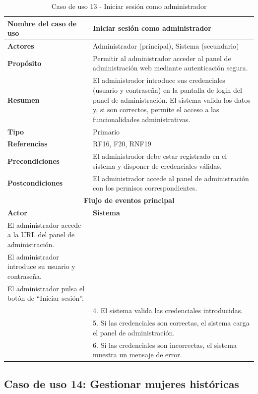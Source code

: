 \begin{table}[H]
\centering
\caption{Caso de uso 13 - Iniciar sesión como administrador}
\begin{tabular}{|p{4.5cm}|p{10.5cm}|}
\hline
\textbf{Nombre del caso de uso} & Iniciar sesión como administrador \\
\hline
\textbf{Actores} & Administrador (principal), Sistema (secundario) \\
\hline
\textbf{Propósito} & Permitir al administrador acceder al panel de administración web mediante autenticación segura. \\
\hline
\textbf{Resumen} & El administrador introduce sus credenciales (usuario y contraseña) en la pantalla de login del panel de administración. El sistema valida los datos y, si son correctos, permite el acceso a las funcionalidades administrativas. \\
\hline
\textbf{Tipo} & Primario \\
\hline
\textbf{Referencias} & RF16, F20, RNF19 \\
\hline
\textbf{Precondiciones} & El administrador debe estar registrado en el sistema y disponer de credenciales válidas. \\
\hline
\textbf{Postcondiciones} & El administrador accede al panel de administración con los permisos correspondientes. \\
\hline
\multicolumn{2}{|c|}{\textbf{Flujo de eventos principal}} \\
\hline
\textbf{Actor} & \textbf{Sistema} \\
\hline
El administrador accede a la URL del panel de administración. & \\
\hline
El administrador introduce su usuario y contraseña. & \\
\hline
El administrador pulsa el botón de “Iniciar sesión”. & \\
\hline
& 4. El sistema valida las credenciales introducidas. \\
\hline
& 5. Si las credenciales son correctas, el sistema carga el panel de administración. \\
\hline
& 6. Si las credenciales son incorrectas, el sistema muestra un mensaje de error. \\
\hline
\end{tabular}
\end{table}

\subsection{Caso de uso 14: Gestionar mujeres históricas}


